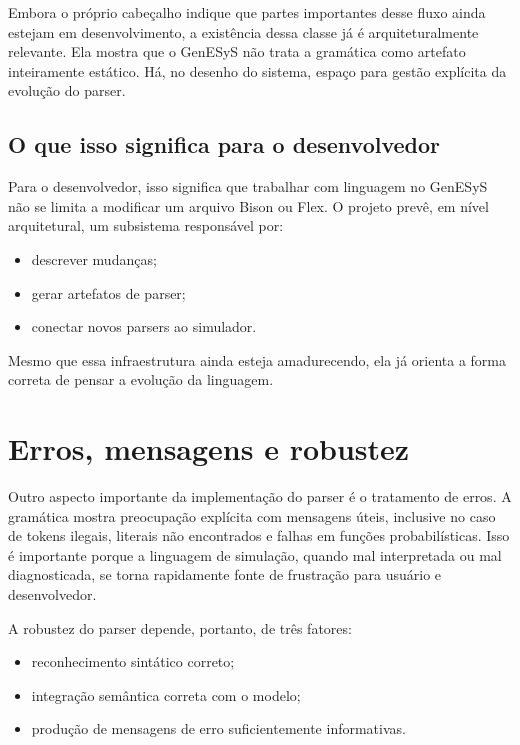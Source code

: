 Embora o próprio cabeçalho indique que partes importantes desse fluxo ainda estejam em desenvolvimento, a existência dessa classe já é arquiteturalmente relevante. Ela mostra que o GenESyS não trata a gramática como artefato inteiramente estático. Há, no desenho do sistema, espaço para gestão explícita da evolução do parser.

\subsection{O que isso significa para o desenvolvedor}
\label{subsec:cap9_o_que_significa_para_desenvolvedor}

Para o desenvolvedor, isso significa que trabalhar com linguagem no GenESyS não se limita a modificar um arquivo Bison ou Flex. O projeto prevê, em nível arquitetural, um subsistema responsável por:
\begin{itemize}
    \item descrever mudanças;
    \item gerar artefatos de parser;
    \item conectar novos parsers ao simulador.
\end{itemize}

Mesmo que essa infraestrutura ainda esteja amadurecendo, ela já orienta a forma correta de pensar a evolução da linguagem.

\section{Erros, mensagens e robustez}
\label{sec:cap9_erros_mensagens_robustez}

Outro aspecto importante da implementação do parser é o tratamento de erros. A gramática mostra preocupação explícita com mensagens úteis, inclusive no caso de tokens ilegais, literais não encontrados e falhas em funções probabilísticas. Isso é importante porque a linguagem de simulação, quando mal interpretada ou mal diagnosticada, se torna rapidamente fonte de frustração para usuário e desenvolvedor.

A robustez do parser depende, portanto, de três fatores:
\begin{itemize}
    \item reconhecimento sintático correto;
    \item integração semântica correta com o modelo;
    \item produção de mensagens de erro suficientemente informativas.
\end{itemize}

